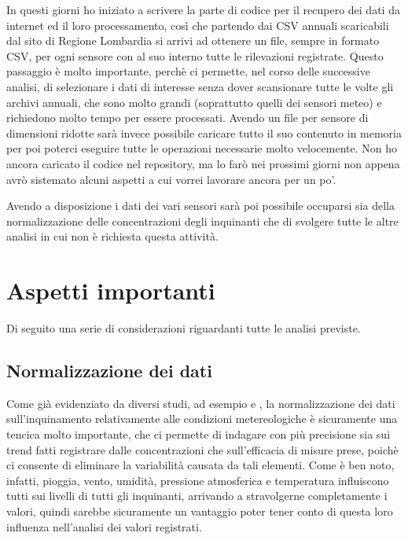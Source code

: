 \documentclass{article}
\begin{document}
In questi giorni ho iniziato a scrivere la parte di codice per il recupero dei dati da internet ed il loro processamento, così che partendo dai CSV annuali scaricabili dal sito di Regione Lombardia si arrivi ad ottenere un file, sempre in formato CSV, per ogni sensore con al suo interno tutte le rilevazioni registrate. Questo passaggio è molto importante, perchè ci permette, nel corso delle successive analisi, di selezionare i dati di interesse senza dover scansionare tutte le volte gli archivi annuali, che sono molto grandi (soprattutto quelli dei sensori meteo) e richiedono molto tempo per essere processati. Avendo un file per sensore di dimensioni ridotte sarà invece possibile caricare tutto il suo contenuto in memoria per poi poterci eseguire tutte le operazioni necessarie molto velocemente.
Non ho ancora caricato il codice nel repository, ma lo farò nei prossimi giorni non appena avrò sistemato alcuni aspetti a cui vorrei lavorare ancora per un po'.

Avendo a disposizione i dati dei vari sensori sarà poi possibile occuparsi sia della normalizzazione delle concentrazioni degli inquinanti che di svolgere tutte le altre analisi in cui non è richiesta questa attività.

\section{Aspetti importanti}
Di seguito una serie di considerazioni riguardanti tutte le analisi previste.
\subsection{Normalizzazione dei dati}
\label{subsec:normalizzazione}
Come già evidenziato da diversi studi, ad esempio \cite{hoogerbrugge2010trends} e \cite{grange2019using}, la normalizzazione dei dati sull'inquinamento relativamente alle condizioni metereologiche è sicuramente una tencica molto importante, che ci permette di indagare con più precisione sia sui trend fatti registrare dalle concentrazioni che sull'efficacia di misure prese, poichè ci consente di eliminare la variabilità causata da tali elementi. Come è ben noto, infatti, pioggia, vento, umidità, pressione atmosferica e temperatura influiscono tutti sui livelli di tutti gli inquinanti, arrivando a stravolgerne completamente i valori, quindi sarebbe sicuramente un vantaggio poter tener conto di questa loro influenza nell'analisi dei valori registrati.
\end{document}
